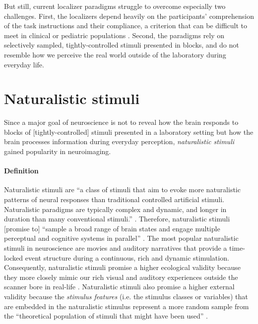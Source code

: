 But still, current localizer paradigms struggle to overcome especially two
challenges.
%
First, the localizers depend heavily on the participants' comprehension of the
task instructions and their compliance, a criterion that can be difficult to
meet in clinical or pediatric populations \citep{eickhoff2020towards,
vanderwal2015inscapes, vanderwal2019movies}.
Second, the paradigms rely on selectively sampled, tightly-controlled stimuli
presented in blocks, and do not resemble how we perceive the real world outside
of the laboratory during everyday life.


\section{Naturalistic stimuli}
%
Since a major goal of neuroscience is not to reveal how the brain
responds to blocks of [tightly-controlled] stimuli presented in a laboratory
setting but how the brain processes information during everyday perception,
\textit{naturalistic stimuli} gained popularity in neuroimaging.


\paragraph{Definition}

Naturalistic stimuli are ``a class of stimuli that aim to evoke more
naturalistic patterns of neural responses than traditional controlled artificial
stimuli. Naturalistic paradigms are typically complex and dynamic, and longer in
duration than many conventional stimuli.'' \citep{vanderwal2019movies}.
%
Therefore, naturalistic stimuli [promise to] ``sample a broad range of brain
states and engage multiple perceptual and cognitive systems in parallel''
\citep{haxby2020naturalistic}.
The most popular naturalistic stimuli in neuroscience are movies and auditory
narratives \citep[s.][for reviews]{jaaskelainen2021movies,
jaaskelainen2020neural} that provide a time-locked event structure during a
continuous, rich and dynamic stimulation.
%
Consequently, naturalistic stimuli promise a higher ecological validity
\citep{zaki2009need, hasson2012future, hamilton2018revolution} because they more
closely mimic our rich visual and auditory experiences outside the scanner bore
in real-life \citep{hasson2008neurocinematics, haxby2020naturalistic}.
%
Naturalistic stimuli also promise a higher external validity because the
\textit{stimulus features} (i.e. the stimulus classes or variables) that are
embedded in the naturalistic stimulus represent a more random sample from the
``theoretical population of stimuli that might have been used''
\citep{westfall2016fixing}.
%


